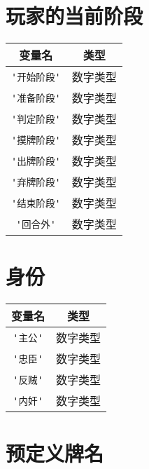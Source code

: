 \section{玩家的当前阶段}

\begin{center}
\begin{longtable}{|c|c|}
\hline \textbf{变量名} & \textbf{类型} \\
\hline \verb|'开始阶段'| & 数字类型 \\
\hline \verb|'准备阶段'| & 数字类型 \\
\hline \verb|'判定阶段'| & 数字类型 \\
\hline \verb|'摸牌阶段'| & 数字类型 \\
\hline \verb|'出牌阶段'| & 数字类型 \\
\hline \verb|'弃牌阶段'| & 数字类型 \\
\hline \verb|'结束阶段'| & 数字类型 \\
\hline \verb|'回合外'| & 数字类型 \\
\hline
\end{longtable}
\end{center}

\section{身份}

\begin{center}
\begin{longtable}{|c|c|}
\hline \textbf{变量名} & \textbf{类型} \\
\hline \verb|'主公'| & 数字类型 \\
\hline \verb|'忠臣'| & 数字类型 \\
\hline \verb|'反贼'| & 数字类型 \\
\hline \verb|'内奸'| & 数字类型 \\
\hline
\end{longtable}
\end{center}

\section{预定义牌名}

